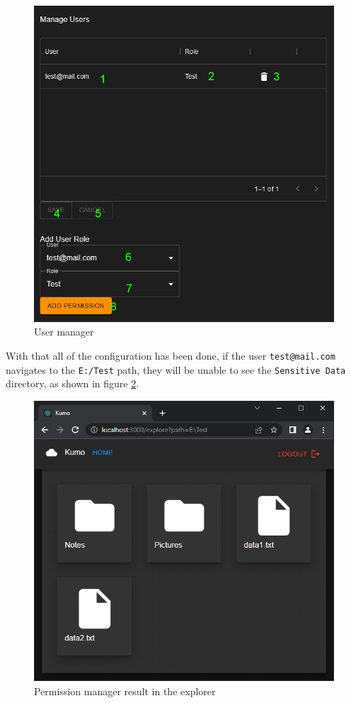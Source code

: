 \begin{figure}[htbp]
	\centering
		\includegraphics[scale=0.5]{./figures/chapter4/permission_manager_users.png}
	\caption{User manager}
	\label{FigPermissionManagerUser}
\end{figure}

With that all of the configuration has been done, if the user \verb|test@mail.com| navigates to the \verb|E:/Test| path, they will be unable to see the \verb|Sensitive Data| directory, as shown in figure \ref{FigPermissionManagerResult}.


\begin{figure}[htbp]
	\centering
		\includegraphics[scale=0.65]{./figures/chapter4/permission_manager_result.png}
	\caption{Permission manager result in the explorer}
	\label{FigPermissionManagerResult}
\end{figure}